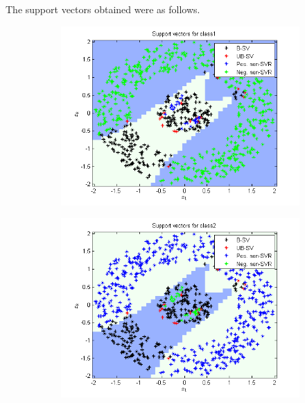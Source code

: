 \documentclass{article}
\begin{document}
The support vectors obtained were as follows.
\begin{figure}
\begin{subfigure}{.5\textwidth}
  \centering
  \includegraphics[width=.8\linewidth]{Classification/1b/c_poly/sv1}
 
\end{subfigure}%
\begin{subfigure}{.5\textwidth}
  \centering
  \includegraphics[width=.8\linewidth]{Classification/1b/c_poly/sv2}
  
\end{subfigure}
\end{figure}
\end{document}
